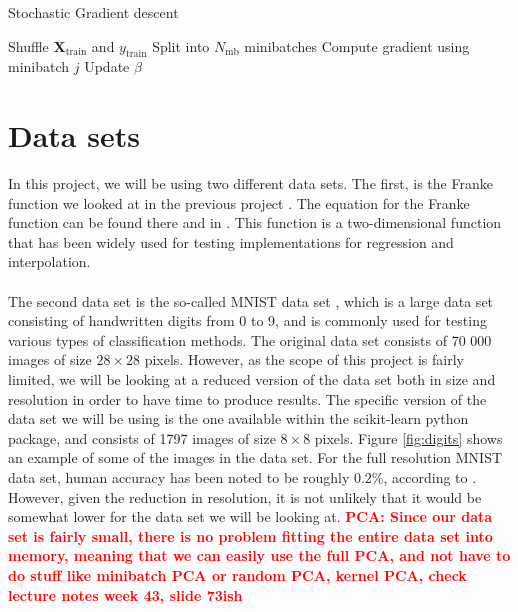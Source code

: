 \documentclass[a4paper]{article}
\newcommand\red[1]{\textcolor{red}{\textbf{#1}}}
\newcommand{\XX}{\mathbf{X}}
\begin{document}
\begin{algorithm}[H]
\caption{Stochastic Gradient descent}
\begin{algorithmic}[1]
\State Shuffle $\XX_{\text{train}}$ and $y_{\text{train}}$
\State Split into $N_{\text{mb}}$ minibatches
\State Compute gradient using minibatch $j$
\State Update $\beta$
\EndFor
\EndFor
\end{algorithmic}
\label{alg:sgd}
\end{algorithm}


\section{Data sets} \label{chap:data_sets}
In this project, we will be using two different data sets. The first, is the Franke function we looked at in the previous project \cite{Github1}. The equation for the Franke function can be found there and in \cite{Franke}. This function is a two-dimensional function that has been widely used for testing implementations for regression and interpolation.
\\\\
%
The second data set is the so-called MNIST data set \cite{MNIST}, which is a large data set consisting of handwritten digits from 0 to 9, and is commonly used for testing various types of classification methods. The original data set consists of 70 000 images of size $28\times28$ pixels. However, as the scope of this project is fairly limited, we will be looking at a reduced version of the data set both in size and resolution in order to have time to produce results. The specific version of the data set we will be using is the one available within the scikit-learn python package, and consists of 1797 images of size $8\times8$ pixels. Figure \ref{fig:digits} shows an example of some of the images in the data set. For the full resolution MNIST data set, human accuracy has been noted to be roughly $0.2$\%, according to \cite{c2012}. However, given the reduction in resolution, it is not unlikely that it would be somewhat lower for the data set we will be looking at.
\red{PCA: Since our data set is fairly small, there is no problem fitting the entire data set into memory, meaning that we can easily use the full PCA, and not have to do stuff like minibatch PCA or random PCA, kernel PCA, check lecture notes week 43, slide 73ish}
\end{document}
